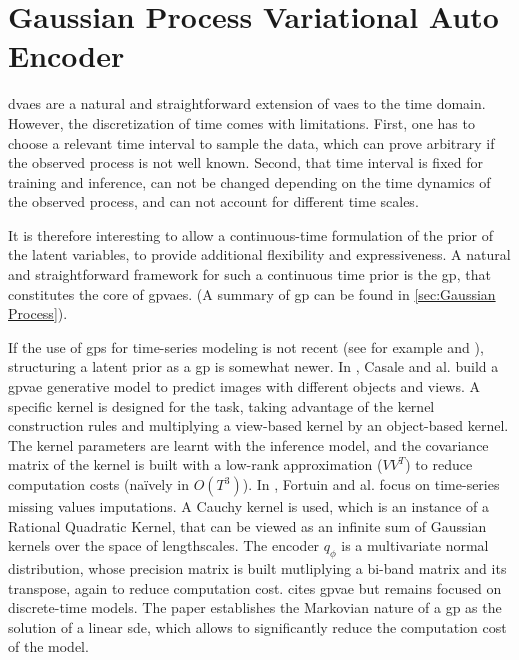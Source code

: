 \chapter{Gaussian Process Variational Auto Encoder}\label{sec:Gaussian Process VAE}

\glspl{dvae} are a natural and straightforward extension of \glspl{vae} to the time domain. However, the discretization of time comes with limitations. First, one has to choose a relevant time interval to sample the data, which can prove arbitrary if the observed process is not well known. Second, that time interval is fixed for training and inference, can not be changed depending on the time dynamics of the observed process, and can not account for different time scales.

It is therefore interesting to allow a continuous-time formulation of the prior of the latent variables, to provide additional 
flexibility and expressiveness. A natural and straightforward framework for such a continuous time prior is the \gls{gp}, 
that constitutes the core of \glspl{gpvae}. (A summary of \gls{gp} can be found in \ref{sec:Gaussian Process}).

If the use of \glspl{gp} for time-series modeling is not recent (see for example \cite{rasmussen_gaussian_2008} and \cite{roberts_gaussian_2013}), structuring a latent prior as a \gls{gp} is somewhat newer. In \cite{casale_gaussian_2018}, Casale and al. build a \gls{gpvae} generative model to predict images with different objects and views. A specific kernel is designed for the task, taking advantage of the kernel construction rules and multiplying a view-based kernel by an object-based kernel. The kernel parameters are learnt with the inference model, and the covariance matrix of the kernel is built with a low-rank approximation ($VV^T$) to reduce computation costs (naïvely in $O(T^3)$). In \cite{fortuin_gp-vae:_2020}, Fortuin and al. focus on time-series missing values imputations. A Cauchy kernel is used, which is an instance of a Rational Quadratic Kernel, that can be viewed as an infinite sum of Gaussian kernels over the space of lengthscales. The encoder $q_\phi$ is a multivariate normal distribution, whose precision matrix is built mutliplying a bi-band matrix and its transpose, again to reduce computation cost. \cite{girin_dynamical_2022} cites \gls{gpvae} but remains focused on discrete-time models. The paper \cite{zhu_markovian_2023} establishes the Markovian nature of a \gls{gp} as the solution of a linear \gls{sde}, which allows to significantly reduce the computation cost of the model. 

